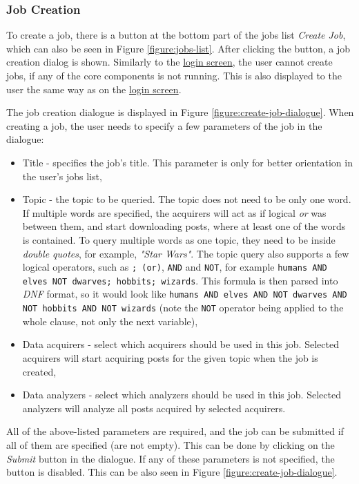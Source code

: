 \documentclass{article}
\begin{document}
\subsubsection{Job Creation}\label{section:job-creation-dialogue}

To create a job, there is a button at the bottom part of the jobs list \textit{Create Job}, which can also be seen in Figure \ref{figure:jobs-list}. After clicking the button, a job creation dialog is shown. Similarly to the \hyperref[section:login]{login screen}, the user cannot create jobs, if any of the core components is not running. This is also displayed to the user the same way as on the \hyperref[section:login]{login screen}.

The job creation dialogue is displayed in Figure \ref{figure:create-job-dialogue}. When creating a job, the user needs to specify a few parameters of the job in the dialogue:
\begin{itemize}
  \item Title - specifies the job's title. This parameter is only for better orientation in the user's jobs list,  
  \item Topic - the topic to be queried. The topic does not need to be only one word. If multiple words are specified, the acquirers will act as if logical \textit{or} was between them, and start downloading posts, where at least one of the words is contained. To query multiple words as one topic, they need to be inside \textit{double quotes}, for example, \textit{"Star Wars"}. The topic query also supports a few logical operators, such as \texttt{; (or)}, \texttt{AND} and \texttt{NOT}, for example \texttt{humans AND elves NOT dwarves; hobbits; wizards}. This formula is then parsed into \textit{DNF} format, so it would look like \texttt{humans AND elves AND NOT dwarves AND NOT hobbits AND NOT wizards} (note the \texttt{NOT} operator being applied to the whole clause, not only the next variable),
  \item Data acquirers - select which acquirers should be used in this job. Selected acquirers will start acquiring posts for the given topic when the job is created,
  \item Data analyzers - select which analyzers should be used in this job. Selected analyzers will analyze all posts acquired by selected acquirers.
\end{itemize}
All of the above-listed parameters are required, and the job can be submitted if all of them are specified (are not empty). This can be done by clicking on the \textit{Submit} button in the dialogue. If any of these parameters is not specified, the button is disabled. This can be also seen in Figure \ref{figure:create-job-dialogue}.
\end{document}
